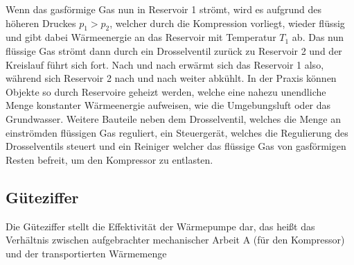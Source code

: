   Wenn das gasförmige Gas nun in Reservoir 1 strömt, wird es aufgrund des höheren Druckes $p_1 > p_2$, welcher durch die Kompression vorliegt, wieder flüssig und gibt dabei Wärmeenergie an das Reservoir mit Temperatur $T_1$ ab. Das nun flüssige Gas strömt dann durch ein Drosselventil zurück zu Reservoir 2 und der Kreislauf führt sich fort.
  Nach und nach erwärmt sich das Reservoir 1 also, während sich Reservoir 2 nach und nach weiter abkühlt.
  In der Praxis können Objekte so durch Reservoire geheizt werden, welche eine nahezu unendliche Menge konstanter Wärmeenergie aufweisen, wie die Umgebungsluft oder das Grundwasser.
  Weitere Bauteile neben dem Drosselventil, welches die Menge an einströmden flüssigen Gas reguliert, ein Steuergerät, welches die Regulierung des Drosselventils steuert und ein Reiniger welcher das flüssige Gas von gasförmigen Resten befreit, um den Kompressor zu entlasten.
  \subsection{Güteziffer}
    Die Güteziffer stellt die Effektivität der Wärmepumpe dar, das heißt das Verhältnis zwischen aufgebrachter mechanischer Arbeit A (für den Kompressor) und der transportierten Wärmemenge 

